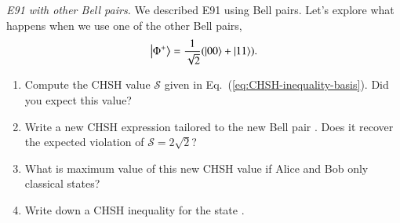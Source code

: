 \begin{exercise}
\emph{E91 with other Bell pairs.} We described E91 using \ket{\Psi^+} Bell pairs. Let's explore what happens when we use one of the other Bell pairs,
\begin{equation}
    \left| \Phi^+ \right\rangle = \frac{1}{\sqrt{2}} (\left| 00 \right\rangle + \left| 11 \right\rangle).
\end{equation}
\begin{enumerate}[label=(\alph*)]
    \item Compute the CHSH value $\mathcal{S}$ given in Eq.~(\ref{eq:CHSH-inequality-basis}). Did you expect this value?
    \item Write a new CHSH expression tailored to the new Bell pair \ket{\Phi^+}. Does it recover the expected violation of $\mathcal{S}=2\sqrt{2}$?
    \item What is maximum value of this new CHSH value if Alice and Bob only classical states?
    \item Write down a CHSH inequality for the state \ket{\Psi^-}.
\end{enumerate}
\end{exercise}
